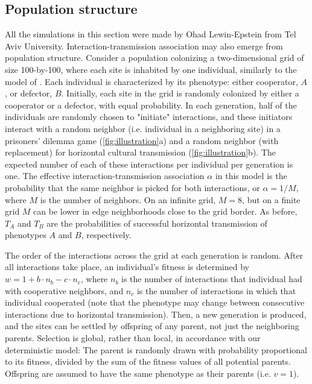 \documentclass[12pt]{extarticle}
\begin{document}
\subsection{Population structure}
All the simulations in this section were made by Ohad Lewin-Epstein from Tel Aviv University.
Interaction-transmission association may also emerge from population structure.
Consider a  population colonizing a two-dimensional grid of size 100-by-100, where each site is inhabited by one individual, similarly to the model of \citet{lewin2020rockpaperscissors}.
Each individual is characterized by its phenotype: either cooperator, $A$, or defector, $B$.
Initially, each site in the grid is randomly colonized by either a cooperator or a defector, with equal probability.
In each generation, half of the individuals are randomly chosen to "initiate" interactions, and these
initiators interact with a random neighbor (i.e. individual in a neighboring site) in a prisoners' dilemma game (\autoref{fig:illustration}a) and a random neighbor (with replacement) for horizontal cultural transmission (\autoref{fig:illustration}b).
The expected number of each of these interactions per individual per generation is one.
The effective interaction-transmission association $\alpha$ in this model is the probability that the same neighbor is picked for both interactions, or $\alpha=1/M$, where $M$ is the number of neighbors.
On an infinite grid, $M=8$, but on a finite grid $M$ can be lower in edge neighborhoods close to the grid border.
As before, $T_A$ and $T_B$ are the probabilities of successful horizontal transmission of phenotypes $A$ and $B$, respectively.

The order of the interactions across the grid at each generation is random.
After all interactions take place, an individual's fitness is determined by
$w = 1 + b \cdot n_b - c \cdot n_c$,
where $n_b$ is the number of interactions that individual had with cooperative neighbors,
and $n_c$ is the number of interactions in which that individual cooperated (note that the phenotype may change between consecutive interactions due to horizontal transmission).
Then, a new generation is produced, and the sites can be settled by offspring of any parent, not just the neighboring parents.
Selection is global, rather than local, in accordance with our deterministic model:
The parent is randomly drawn with probability proportional to its fitness, divided by the sum of the fitness values of all potential parents.
Offspring are assumed to have the same phenotype as their parents (i.e. $v=1$).
\end{document}
